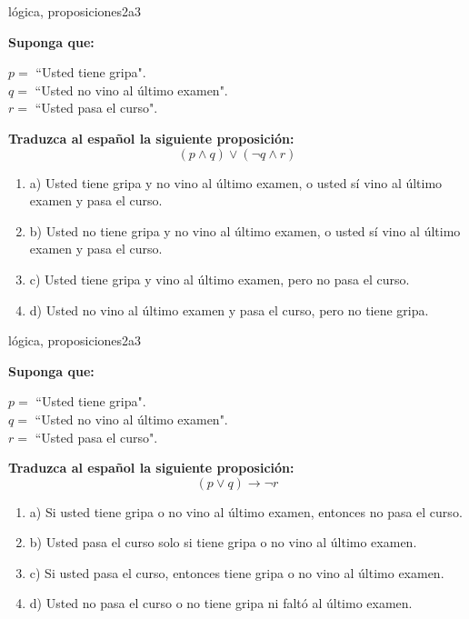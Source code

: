 \documentclass{article}
\begin{document}
\begin{question}{9}{lógica, proposiciones}{2}{a}{3}{
\textbf{Suponga que:} \medskip

\(p = \) ``Usted tiene gripa".\\
\(q = \) ``Usted no vino al último examen".\\
\(r = \) ``Usted pasa el curso". \medskip

\textbf{Traduzca al español la siguiente proposición:}
\[
(p \land q)\lor(\neg q \land r)
\]

\begin{enumerate}
    \item a) Usted tiene gripa y no vino al último examen, o usted sí vino al último examen y pasa el curso.
    \item b) Usted no tiene gripa y no vino al último examen, o usted sí vino al último examen y pasa el curso.
    \item c) Usted tiene gripa y vino al último examen, pero no pasa el curso.
    \item d) Usted no vino al último examen y pasa el curso, pero no tiene gripa.
\end{enumerate}
}
\end{question}

\begin{question}{10}{lógica, proposiciones}{2}{a}{3}{
\textbf{Suponga que:} \medskip

\(p = \) ``Usted tiene gripa".\\
\(q = \) ``Usted no vino al último examen".\\
\(r = \) ``Usted pasa el curso". \medskip

\textbf{Traduzca al español la siguiente proposición:}
\[
(p \lor q) \rightarrow \neg r
\]

\begin{enumerate}
   \item a) Si usted tiene gripa o no vino al último examen, entonces no pasa el curso.  
   \item b) Usted pasa el curso solo si tiene gripa o no vino al último examen.  
   \item c) Si usted pasa el curso, entonces tiene gripa o no vino al último examen.  
   \item d) Usted no pasa el curso o no tiene gripa ni faltó al último examen.  
\end{enumerate}
}
\end{question}
\end{document}
